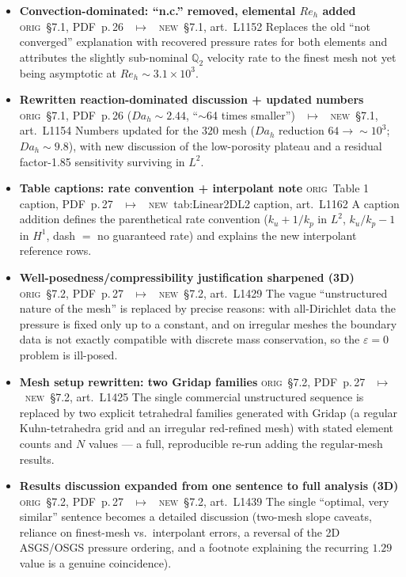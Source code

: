 \documentclass[11pt]{article}
\newcommand{\Orig}{\textcolor{origc}{\footnotesize\textsc{orig}}}
\newcommand{\New}{\textcolor{newc}{\footnotesize\textsc{new}}}
\newcommand{\code}[1]{\textcolor{newc}{\ttfamily\small #1}}
\newcommand{\pdfp}[1]{PDF~p.\,#1}
\newcommand{\artl}[1]{art.\ L#1}       %
\newcommand{\ch}[4]{%
  \item \textbf{#1}\newline
    {\footnotesize\Orig\ #2 \ \textcolor{locc}{$\longmapsto$} \ \New\ #3}\newline
    #4}
\begin{document}
\begin{itemize}
{    projection removing resolvable residual components --- confirming the predicted one-order pressure
    loss is real, not a proof artifact.}
\ch{Convection-dominated: ``n.c.'' removed, elemental $Re_h$ added}
   {\S7.1, \pdfp{26}}
   {\S7.1, \artl{1152}}
   {Replaces the old ``not converged'' explanation with recovered pressure rates for both elements and
    attributes the slightly sub-nominal $\mathbb{Q}_2$ velocity rate to the finest mesh not yet being
    asymptotic at $Re_h\!\sim\!3.1\times10^3$.}
\ch{Rewritten reaction-dominated discussion + updated numbers}
   {\S7.1, \pdfp{26} ($Da_h\!\sim\!2.44$, ``$\sim$64 times smaller'')}
   {\S7.1, \artl{1154}}
   {Numbers updated for the $320$ mesh ($Da_h$ reduction $64\to\sim\!10^3$; $Da_h\!\sim\!9.8$), with new
    discussion of the low-porosity plateau and a residual factor-1.85 sensitivity surviving in $L^2$.}
\ch{Table captions: rate convention + interpolant note}
   {Table 1 caption, \pdfp{27}}
   {\code{tab:Linear2DL2} caption, \artl{1162}}
   {A caption addition defines the parenthetical rate convention ($k_u{+}1/k_p$ in $L^2$,
    $k_u/k_p{-}1$ in $H^1$, dash $=$ no guaranteed rate) and explains the new interpolant reference rows.}
\ch{Well-posedness/compressibility justification sharpened (3D)}
   {\S7.2, \pdfp{27}}
   {\S7.2, \artl{1429}}
   {The vague ``unstructured nature of the mesh'' is replaced by precise reasons: with all-Dirichlet
    data the pressure is fixed only up to a constant, and on irregular meshes the boundary data is not
    exactly compatible with discrete mass conservation, so the $\varepsilon{=}0$ problem is ill-posed.}
\ch{Mesh setup rewritten: two Gridap families}
   {\S7.2, \pdfp{27}}
   {\S7.2, \artl{1425}}
   {The single commercial unstructured sequence is replaced by two explicit tetrahedral families
    generated with Gridap (a regular Kuhn-tetrahedra grid and an irregular red-refined mesh) with
    stated element counts and $N$ values --- a full, reproducible re-run adding the regular-mesh results.}
\ch{Results discussion expanded from one sentence to full analysis (3D)}
   {\S7.2, \pdfp{27}}
   {\S7.2, \artl{1439}}
   {The single ``optimal, very similar'' sentence becomes a detailed discussion (two-mesh slope
    caveats, reliance on finest-mesh vs.\ interpolant errors, a reversal of the 2D ASGS/OSGS pressure
    ordering, and a footnote explaining the recurring $1.29$ value is a genuine coincidence).}
\end{itemize}
\end{document}
